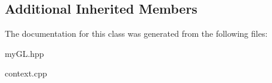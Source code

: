 \subsection*{Additional Inherited Members}


The documentation for this class was generated from the following files\+:\begin{DoxyCompactItemize}
\item 
my\+G\+L.\+hpp\item 
context.\+cpp\end{DoxyCompactItemize}
